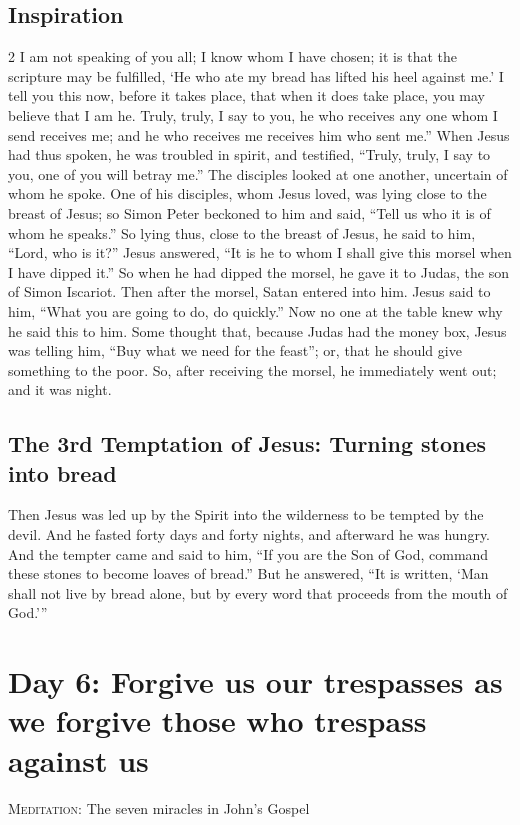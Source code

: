 \subsection{Inspiration}
\begin{multicols}{2}\small
I am not speaking of you all; I know whom I have chosen; it is that the scripture may be fulfilled,
`He who ate my bread has lifted his heel against me.' I tell you this now, before it takes place, that when it does take place, you may believe that I am he. Truly, truly, I say to you, he who receives any one whom I send receives me; and he who receives me receives him who sent me.” When Jesus had thus spoken, he was troubled in spirit, and testified, “Truly, truly, I say to you, one of you will betray me.” The disciples looked at one another, uncertain of whom he spoke. One of his disciples, whom Jesus loved, was lying close to the breast of Jesus; so Simon Peter beckoned to him and said, “Tell us who it is of whom he speaks.” So lying thus, close to the breast of Jesus, he said to him, “Lord, who is it?” Jesus answered, “It is he to whom I shall give this morsel when I have dipped it.” So when he had dipped the morsel, he gave it to Judas, the son of Simon Iscariot. Then after the morsel, Satan entered into him. Jesus said to him, “What you are going to do, do quickly.” Now no one at the table knew why he said this to him. Some thought that, because Judas had the money box, Jesus was telling him, “Buy what we need for the feast”; or, that he should give something to the poor. So, after receiving the morsel, he immediately went out; and it was night. 
\end{multicols}


\subsection{The 3rd Temptation of Jesus: Turning stones into bread}
\begin{quotationx}
Then Jesus was led up by the Spirit into the wilderness to be tempted by the devil. And he fasted forty days and forty
nights, and afterward he was hungry. And the tempter came and said to him, “If you are the Son of God, command these
stones to become loaves of bread.” But he answered, “It is written, ‘Man shall not live by bread
alone, but by every word that proceeds from the mouth of God.'” 
\end{quotationx}

\section{Day 6: Forgive us our trespasses as we forgive those who trespass against us}
\textsc{Meditation}: The seven miracles in John's Gospel

